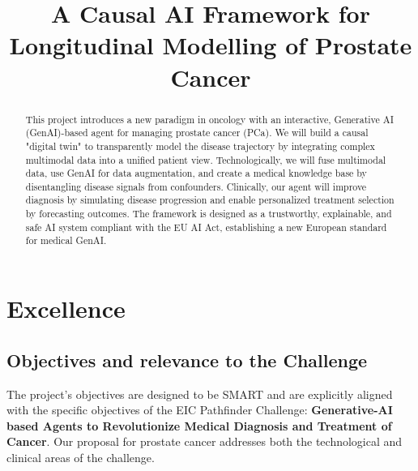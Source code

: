 \documentclass[11pt, a4paper]{article}
\title{A Causal AI Framework for Longitudinal Modelling of Prostate Cancer}
\author{}
\date{}
\begin{document}
\maketitle

\begin{abstract}
This project introduces a new paradigm in oncology with an interactive, Generative AI (GenAI)-based agent for managing prostate cancer (PCa). We will build a causal "digital twin" to transparently model the disease trajectory by integrating complex multimodal data into a unified patient view. Technologically, we will fuse multimodal data, use GenAI for data augmentation, and create a medical knowledge base by disentangling disease signals from confounders. Clinically, our agent will improve diagnosis by simulating disease progression and enable personalized treatment selection by forecasting outcomes. The framework is designed as a trustworthy, explainable, and safe AI system compliant with the EU AI Act, establishing a new European standard for medical GenAI.
\end{abstract}

\section{Excellence}

\subsection{Objectives and relevance to the Challenge}
The project's objectives are designed to be SMART and are explicitly aligned with the specific objectives of the EIC Pathfinder Challenge: \textbf{Generative-AI based Agents to Revolutionize Medical Diagnosis and Treatment of Cancer}. Our proposal for prostate cancer addresses both the technological and clinical areas of the challenge.
\end{document}

